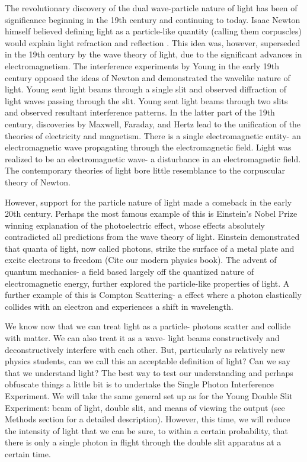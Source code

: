 \documentclass[prb,preprint]{revtex4-1}
\begin{document}
The revolutionary discovery of the dual wave-particle nature of light has been of significance beginning in the 19th century and continuing to today.  Isaac Newton himself believed defining light as a particle-like quantity (calling them corpuscles) would explain light refraction and reflection \cite{newton}.  This idea was, however, superseded in the 19th century by the wave theory of light, due to the significant advances in electromagnetism.  The interference experiments by Young in the early 19th century opposed the ideas of Newton and demonstrated the wavelike nature of light.  Young sent light beams through a single slit and observed diffraction of light waves passing through the slit.  Young sent light beams through two slits and observed resultant interference patterns.  In the latter part of the 19th century, discoveries by Maxwell, Faraday, and Hertz lead to the unification of the theories of electricity and magnetism.  There is a single electromagnetic entity- an electromagnetic wave propagating through the electromagnetic field.  Light was realized to be an electromagnetic wave- a disturbance in an electromagnetic field.  The contemporary theories of light bore little resemblance to the corpuscular theory of Newton.  \cite{david}

However, support for the particle nature of light made a comeback in the early 20th century.  Perhaps the most famous example of this is Einstein's Nobel Prize winning explanation of the photoelectric effect, whose effects absolutely contradicted all predictions from the wave theory of light.  Einstein demonstrated that quanta of light, now called photons, strike the surface of a metal plate and excite electrons to freedom (Cite our modern physics book).  The advent of quantum mechanics- a field based largely off the quantized nature of electromagnetic energy, further explored the particle-like properties of light.  A further example of this is Compton Scattering- a effect where a photon elastically collides with an electron and experiences a shift in wavelength.  

We know now that we can treat light as a particle- photons scatter and collide with matter.  We can also treat it as a wave- light beams constructively and deconstructively interfere with each other.  But, particularly as relatively new physics students, can we call this an acceptable definition of light?  Can we say that we understand light?  The best way to test our understanding and perhaps obfuscate things a little bit is to undertake the Single Photon Interference Experiment.  We will take the same general set up as for the Young Double Slit Experiment:  beam of light, double slit, and means of viewing the output (see Methods section for a detailed description).  However, this time, we will reduce the intensity of light that we can be sure, to within a certain probability, that there is only a single photon in flight through the double slit apparatus at a certain time. \cite{teachspin}
\end{document}

